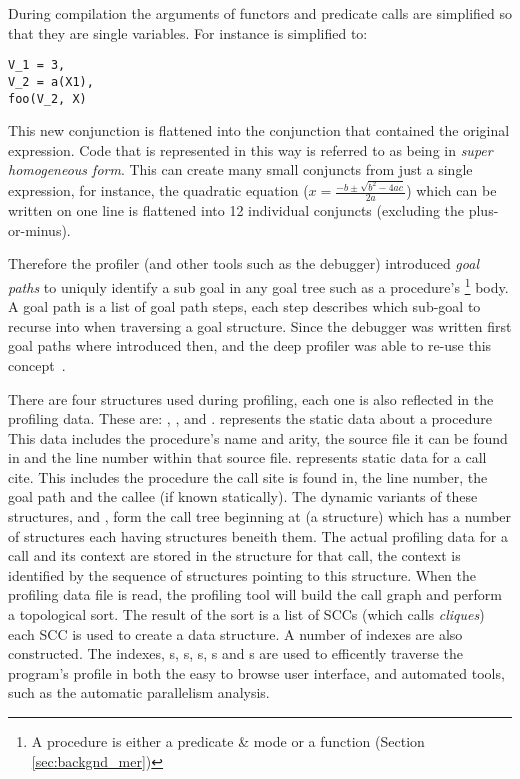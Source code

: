During compilation the arguments of functors and predicate calls are
simplified so that they are single variables.
For instance  is simplified to:

\begin{verbatim}
V_1 = 3,
V_2 = a(X1),
foo(V_2, X)
\end{verbatim}

\noindent
This new conjunction is flattened into the conjunction that contained the
original expression.
Code that is represented in this way is referred to as being in \emph{super
homogeneous form}.
This can create many small conjuncts from just a single expression,
for instance, the quadratic equation
($x=\frac{-b \pm \sqrt {b^2-4ac}}{2a}$) which can be written on one line
is flattened into 12 individual conjuncts (excluding the plus-or-minus).

Therefore the profiler
(and other tools such as the debugger) introduced \emph{goal paths}
to uniquly identify a sub goal in any goal tree such as a procedure's%
\footnote{
A procedure is either a predicate \& mode or a function (Section
\ref{sec:backgnd_mer})}
body.
A goal path is a list of goal path steps, each step describes which
sub-goal to recurse into when traversing a goal structure.
Since the debugger was written first goal paths where introduced then,
and the deep profiler was able to re-use this concept~\cite{mdb}.

There are four structures used during profiling,
each one is also reflected in the profiling data.
These are: {\PS}, {\PD}, {\CSS} and {\CSD}.
{\PS} represents the static data about a procedure
This data includes the procedure's name and arity,
the source file it can be found in and the line number within that source file.
\CSS represents static data for a call cite.
This includes the procedure the call site is found in, the line number,
the goal path and the callee (if known statically).
The dynamic variants of these structures, \PD and {\CSD},
form the call tree beginning at  (a \PD structure)
which has a number of \CSD structures each having \PD structures
beneith them.
The actual profiling data for a call and its context are stored in
the \CSD structure for that call,
the context is identified by the sequence of structures pointing to this
structure.
When the profiling data file is read,
the profiling tool will build the call graph and perform a topological
sort.
The result of the sort is a list of SCCs
(which \citet{conway-deep} calls \emph{cliques})
each SCC is used to create a \Clique data structure.
A number of indexes are also constructed.
The indexes, {\Clique}s, {\PS}s, {\PD}s, {\CSS}s and {\CSD}s are used to
efficently traverse the program's profile in both
the easy to browse user interface,
and automated tools, such as the automatic parallelism analysis.

